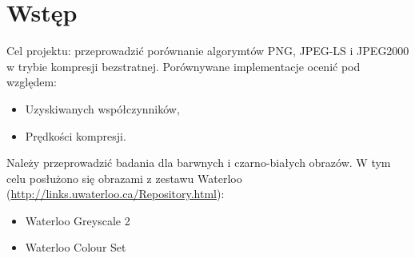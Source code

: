 \section{Wstęp}

Cel projektu: przeprowadzić porównanie algorymtów PNG, JPEG-LS i JPEG2000 w trybie kompresji bezstratnej. Porównywane implementacje ocenić pod względem:

\begin{itemize}
	\item Uzyskiwanych współczynników,
	\item Prędkości kompresji.
\end{itemize}

Należy przeprowadzić badania dla barwnych i czarno-białych obrazów. W tym celu posłużono się obrazami z zestawu Waterloo (\url{http://links.uwaterloo.ca/Repository.html}):

\begin{itemize}
	\item Waterloo Greyscale 2
	\item Waterloo Colour Set
\end{itemize}